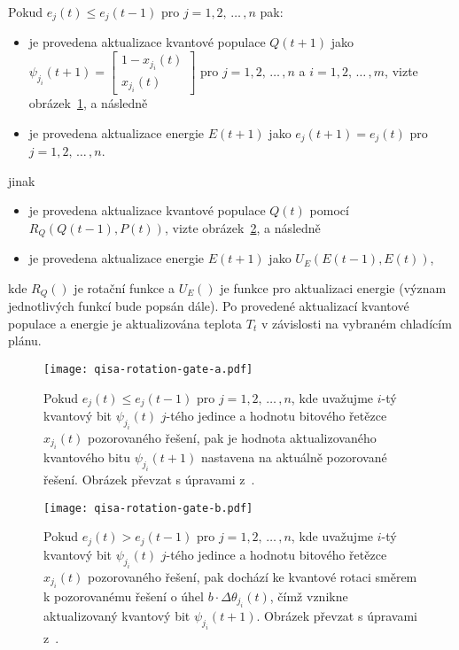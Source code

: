 Pokud $e_j\left(t\right) \leq e_j\left(t-1\right)$ pro $j = 1,2,\,\dots\,,n$ pak:
\begin{itemize}
    \item je provedena aktualizace kvantové populace $Q\left(t+1\right)$ jako $\psi_{j_i}\left(t+1\right) = \begin{bmatrix} 1 - x_{j_i}\left(t\right) \\ x_{j_i}\left(t\right) \end{bmatrix}$ pro $j=1,2,\,\dots\,,n$ a $i=1,2,\,\dots\,,m$, vizte obrázek~\ref{fig:rotation-gate-a}, a následně
    \item je provedena aktualizace energie $E\left(t+1\right)$ jako $e_j\left(t+1\right) = e_j\left(t\right)$ pro $j=1,2,\,\dots\,,n$.
\end{itemize}
jinak
\begin{itemize}
    \item je provedena aktualizace kvantové populace $Q\left(t\right)$ pomocí $R_Q\left(Q\left(t-1\right), P\left(t\right) \right)$, vizte obrázek~\ref{fig:rotation-gate-b}, a následně
    \item je provedena aktualizace energie $E\left(t+1\right)$ jako $U_E\left(E\left(t-1\right), E\left(t\right)\right)$,
\end{itemize}
kde $R_Q\left(\right)$ je rotační funkce a $U_E\left(\right)$ je funkce pro aktualizaci energie (význam jednotlivých funkcí bude popsán dále).
Po provedené aktualizací kvantové populace a energie je aktualizována teplota $T_t$ v závislosti na vybraném chladícím plánu.

\begin{figure}[ht!]
    \centering
    \texttt{[image: qisa-rotation-gate-a.pdf]}
    \caption{Pokud $e_j\left(t\right) \leq e_j\left(t-1\right)$ pro $j = 1,2,\,\dots\,,n$, kde uvažujme $i$-tý kvantový bit $\psi_{j_i}\left(t\right)$ $j$-tého jedince a hodnotu bitového řetězce $x_{j_i} \left(t\right)$ pozorovaného řešení, pak je hodnota aktualizovaného kvantového bitu $\psi_{j_i}\left(t+1\right)$ nastavena na aktuálně pozorované řešení. Obrázek převzat s úpravami z~\cite{qisa}.}
    \label{fig:rotation-gate-a}
\end{figure}

\begin{figure}[ht!]
    \centering
    \texttt{[image: qisa-rotation-gate-b.pdf]}
    \caption{Pokud $e_j\left(t\right) > e_j\left(t-1\right)$ pro $j = 1,2,\,\dots\,,n$, kde uvažujme $i$-tý kvantový bit $\psi_{j_i}\left(t\right)$ $j$-tého jedince a hodnotu bitového řetězce $x_{j_i} \left(t\right)$ pozorovaného řešení, pak dochází ke kvantové rotaci směrem k pozorovanému řešení o úhel $b \cdot \Delta\theta_{j_i}\left(t\right)$, čímž vznikne aktualizovaný kvantový bit $\psi_{j_i}\left(t+1\right)$. Obrázek převzat s úpravami z~\cite{qisa}.}
    \label{fig:rotation-gate-b}
\end{figure}

